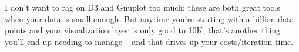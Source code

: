 I don't want to rag on D3 and Gnuplot too much; these are both great tools when
your data is small enough. But anytime you're starting with a billion data
points and your visualization layer is only good to 10K, that's another thing
you'll end up needing to manage -- and that drives up your costs/iteration time.
